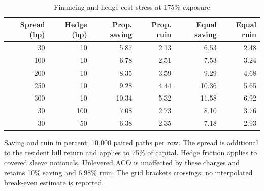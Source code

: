 \begin{table}[htbp]\centering\small
\caption{Financing and hedge-cost stress at 175\% exposure}\label{tab:review-costs}
\begin{tabular}{rrrrrr}\toprule
Spread (bp) & Hedge (bp) & Prop. saving & Prop. ruin & Equal saving & Equal ruin \\
\midrule
30 & 10 & 5.87 & 2.13 & 6.53 & 2.48 \\
100 & 10 & 6.78 & 2.51 & 7.53 & 3.24 \\
200 & 10 & 8.35 & 3.59 & 9.29 & 4.68 \\
250 & 10 & 9.28 & 4.44 & 10.36 & 5.65 \\
300 & 10 & 10.34 & 5.32 & 11.58 & 6.92 \\
30 & 100 & 7.08 & 2.73 & 8.10 & 3.76 \\
30 & 50 & 6.38 & 2.35 & 7.18 & 2.93 \\
\bottomrule\end{tabular}
\par\smallskip\begin{minipage}{0.96\textwidth}\footnotesize
Saving and ruin in percent; 10,000 paired paths per row. The spread is additional to the resident bill return and applies to 75\% of capital. Hedge friction applies to covered sleeve notionals. Unlevered ACO is unaffected by these charges and retains 10\% saving and 6.98\% ruin. The grid brackets crossings; no interpolated break-even estimate is reported.
\end{minipage}\end{table}
